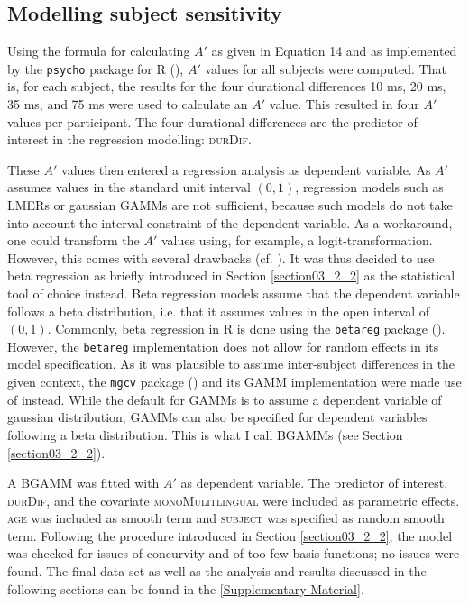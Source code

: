 \subsection{Modelling subject sensitivity}\label{section06_2_3}

Using the formula for calculating $A'$ as given in Equation 14 and as implemented by the \texttt{psycho} package for R (\cite{Makowski2018}), $A'$ values for all subjects were computed. That is, for each subject, the results for the four durational differences 10 ms, 20 ms, 35 ms, and 75 ms were used to calculate an $A'$ value. This resulted in four $A'$ values per participant. The four durational differences are the predictor of interest in the regression modelling: \textsc{durDif}.

These $A'$ values then entered a regression analysis as dependent variable. As $A'$ assumes values in the standard unit interval $(0,1)$, regression models such as LMERs or gaussian GAMMs are not sufficient, because such models do not take into account the interval constraint of the dependent variable. As a workaround, one could transform the $A'$ values using, for example, a logit-transformation. However, this comes with several drawbacks (cf. \cite{Cribari2010}). It was thus decided to use beta regression as briefly introduced in Section \ref{section03_2_2} as the statistical tool of choice instead. Beta regression models assume that the dependent variable follows a beta distribution, i.e. that it assumes values in the open interval of $(0,1)$. Commonly, beta regression in R is done using the \texttt{betareg} package (\cite{Cribari2010}). However, the \texttt{betareg} implementation does not allow for random effects in its model specification. As it was plausible to assume inter-subject differences in the given context, the \texttt{mgcv} package (\cite{Wood2017}) and its GAMM implementation were made use of instead. While the default for GAMMs is to assume a dependent variable of gaussian distribution, GAMMs can also be specified for dependent variables following a beta distribution. This is what I call BGAMMs (see Section \ref{section03_2_2}).

A BGAMM was fitted with $A'$ as dependent variable. The predictor of interest, \textsc{durDif}, and the covariate \textsc{monoMulitlingual} were included as parametric effects. \textsc{age} was included as smooth term and \textsc{subject} was specified as random smooth term. Following the procedure introduced in Section \ref{section03_2_2}, the model was checked for issues of concurvity and of too few basis functions; no issues were found. The final data set as well as the analysis and results discussed in the following sections can be found in the \ref{Supplementary Material}.

